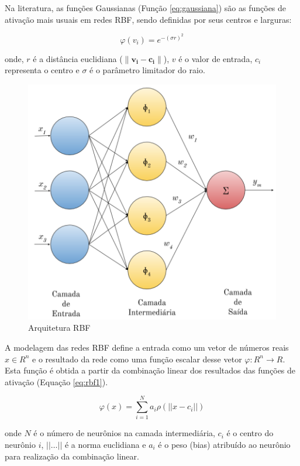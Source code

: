 \documentclass[msc, classic, a4paper]{ufbathesis}
\begin{document}
Na literatura, as funções Gaussianas (Função \ref{eq:gaussiana}) são as funções de ativação mais usuais em redes RBF, sendo definidas por seus centros e larguras:

\begin{equation}
    \label{eq:gaussiana}
    \varphi (v_{i})=e^{-(\sigma r)^{2}}
\end{equation}

onde, $r$ é a distância euclidiana ($\|\mathbf {v_{i}} - \mathbf {c_{i}}\|$), $v$ é o valor de entrada, $c_i$ representa o centro e $\sigma$ é o parâmetro limitador do raio.

\begin{figure}[H]
\begin{center}
    \includegraphics[scale=1]{imagens/rbf_arq.png}
    \caption{Arquitetura RBF}
    \label{fig:rbg_arq}
\end{center}
\end{figure}

A modelagem das redes RBF define a entrada como um vetor de números reais ${x} \in {R} ^{n}$ e o resultado da rede como uma função escalar desse vetor $\varphi : {R} ^{n} \to {R}$.
Esta função é obtida a partir da combinação linear dos resultados das funções de ativação (Equação \ref{eq:rbf1}).

\begin{equation} \label{eq:rbf1}
    \varphi ({x})=\sum _{{i=1}}^{N}a_{i}\rho (||{x}-{c}_{i}||)
\end{equation}

onde $N$ é o número de neurônios na camada intermediária, ${c}_{i}$ é o centro do neurônio $i$, $||\ldots||$ é a norma euclidiana e $a_{i}$ é o peso (bias) atribuído ao neurônio para realização da combinação linear.
\end{document}

